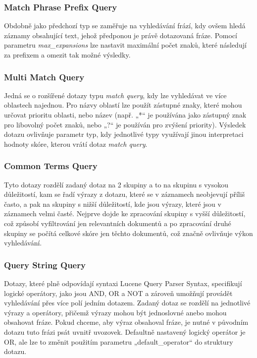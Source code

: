 \documentclass[czech,BP]{thesiskiv}
\begin{document}
\subsubsection{Match Phrase Prefix Query}
Obdobně jako předchozí typ se zaměřuje na vyhledávání frází, kdy ovšem hledá záznamy obsahující text, jehož předponou je právě dotazovaná fráze. Pomocí parametru \textit{max\_expansions} lze nastavit maximální počet znaků, které následují za prefixem a omezit tak možné výsledky.

\subsubsection{Multi Match Query}
Jedná se o rozšířené dotazy typu \textit{match query}, kdy lze vyhledávat ve více oblastech najednou. Pro názvy oblastí lze použít zástupné znaky, které mohou určovat prioritu oblasti, nebo název (např. „*“ je používána jako zástupný znak pro libovolný počet znaků, nebo „?“ je používán pro zvýšení priority). Výsledek dotazu ovlivňuje parametr typ, kdy jednotlivé typy využívají jinou interpretaci hodnoty skóre, kterou vrátí dotaz \textit{match query}.

\subsubsection{Common Terms Query}
Tyto dotazy rozdělí zadaný dotaz na 2 skupiny a to na skupinu s vysokou důležitostí, kam se řadí výrazy z dotazu, které se v záznamech neobjevují příliš často, a pak na skupiny s nižší důležitostí, kde jsou výrazy, které jsou v záznamech velmi časté. Nejprve dojde ke zpracování skupiny s vyšší důležitostí, což způsobí vyfiltrování jen relevantních dokumentů a po zpracování druhé skupiny se počítá celkové skóre jen těchto dokumentů, což značně ovlivňuje výkon vyhledávání.

\subsubsection{Query String Query}
Dotazy, které plně odpovídají syntaxi Lucene Query Parser Syntax, specifikují logické operátory, jako jsou AND, OR a NOT a zároveň umožňují provádět vyhledávání přes více polí jedním dotazem. Zadaný dotaz se rozdělí na jednotlivé výrazy a operátory, přičemž výrazy mohou být jednoslovné anebo mohou obsahovat fráze. Pokud chceme, aby výraz obsahoval fráze, je nutné v původním dotazu tuto frázi psát uvnitř uvozovek. Defaultně nastavený logický operátor je OR, ale lze to změnit použitím parametru „default\_operator“ do struktury dotazu.
\end{document}
